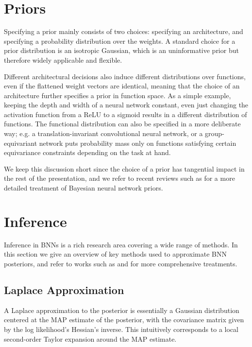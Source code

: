 \section{Priors}

Specifying a prior mainly consists of two choices: specifying an architecture, and specifying a probability distribution over the weights. A standard choice for a prior distribution is an isotropic Gaussian, which is an uninformative prior but therefore widely applicable and flexible. 

Different architectural decisions also induce different distributions over functions, even if the flattened weight vectors are identical, meaning that the choice of an architecture further specifies a prior in function space. As a simple example, keeping the depth and width of a neural network constant, even just changing the activation function from a ReLU to a sigmoid results in a different distribution of functions. The functional distribution can also be specified in a more deliberate way; e.g. a translation-invariant convolutional neural network, or a group-equivariant network \citep{cohenGroupEquivariantConvolutional2016} puts probability mass only on functions satisfying certain equivariance constraints depending on the task at hand. 

We keep this discussion short since the choice of a prior has tangential impact in the rest of the presentation, and we refer to recent reviews such as \citep{fortuinPriorsBayesianDeep2022} for a more detailed treatment of Bayesian neural network priors. 

\section{Inference} \label{section:bayesian_inference}

Inference in BNNs is a rich research area covering a wide range of methods. In this section we give an overview of key methods used to approximate BNN posteriors, and refer to works such as \citep{arbelPrimerBayesianNeural2023} and \citep{murphyProbabilisticMachineLearning2023} for more comprehensive treatments. 

\subsection{Laplace Approximation}

A Laplace approximation to the posterior \citep{mackayPracticalBayesianFramework1992} is essentially a Gaussian distribution centered at the MAP estimate of the posterior, with the covariance matrix given by the log likelihood's Hessian's inverse. This intuitively corresponds to a local second-order Taylor expansion around the MAP estimate. 

